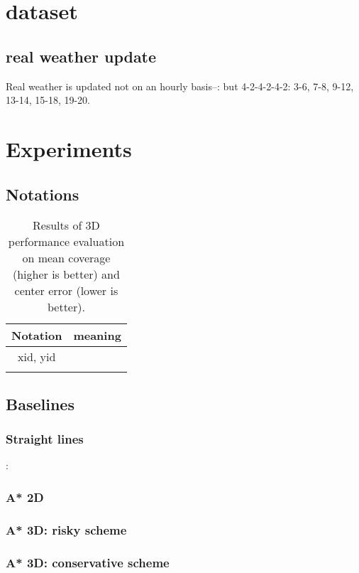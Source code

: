 \documentclass{article}
\begin{document}
\section{dataset}
 \subsection{real weather update}
 Real weather is updated not on an hourly basis--: but 4-2-4-2-4-2: 3-6, 7-8, 9-12, 13-14, 15-18, 19-20.

\section{Experiments}
\subsection{Notations}
\begin{table}[t]
\small
   \centering
        \begin{tabu}{@{}cc@{}}\toprule
        [-1pt] 
        Notation                       &   meaning        \\
        \hline
        xid, yid   & \\
        [-1pt] 
        \end{tabu}

    \caption{ {\small
    Results of 3D performance evaluation on mean coverage (higher is better) and center error (lower is better).
     }
          } \label{table_baseline_3d}
\end{table}

\subsection{Baselines}
\subsubsection{Straight lines}:
\subsubsection{A* 2D}
\subsubsection{A* 3D: risky scheme}
\subsubsection{A* 3D: conservative scheme}
\end{document}
